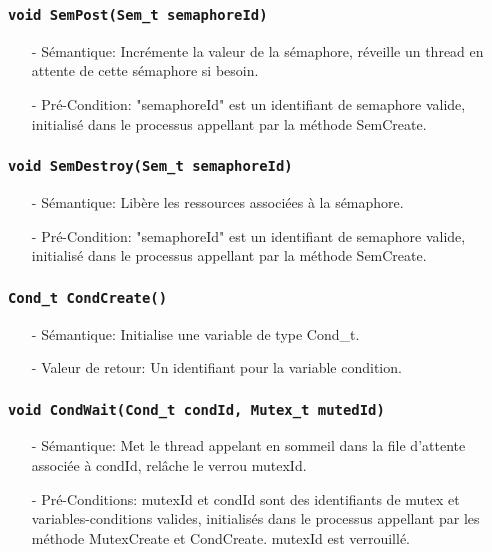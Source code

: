 \documentclass[11pt]{article}
\begin{document}
\subsubsection{\texttt{void SemPost(Sem\_t semaphoreId)}}
\begin{itemize}
\item[-]Sémantique: Incrémente la valeur de la sémaphore, réveille un thread en attente de cette sémaphore
  si besoin.
\item[-]Pré-Condition: "semaphoreId" est un identifiant de semaphore valide, initialisé dans le processus
  appellant par la méthode SemCreate.
\end{itemize}

\subsubsection{\texttt{void SemDestroy(Sem\_t semaphoreId)}}
\begin{itemize}
\item[-]Sémantique: Libère les ressources associées à la sémaphore.
\item[-]Pré-Condition: "semaphoreId" est un identifiant de semaphore valide, initialisé dans le processus
  appellant par la méthode SemCreate.
\end{itemize}

\subsubsection{\texttt{Cond\_t CondCreate()}}
\begin{itemize}
\item[-]Sémantique: Initialise une variable de type Cond\_t.
\item[-]Valeur de retour: Un identifiant pour la variable condition.
\end{itemize}

\subsubsection{\texttt{void CondWait(Cond\_t condId, Mutex\_t mutedId)}}
\begin{itemize}
\item[-]Sémantique: Met le thread appelant en sommeil dans la file d'attente associée à condId,
  relâche le verrou mutexId.
\item[-]Pré-Conditions: mutexId et condId sont des identifiants de mutex et variables-conditions
  valides, initialisés dans le processus appellant par les méthode MutexCreate et CondCreate.
  mutexId est verrouillé.
\end{itemize}
\end{document}

